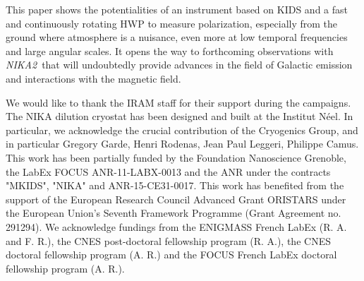 \documentclass[twocolumn, traditabstract]{aa}
\newcommand{\nikad}{{\it NIKA2}}
\begin{document}
This paper shows the potentialities of an instrument based on
KIDS and a fast and continuously rotating HWP to measure polarization, especially
from the ground where atmosphere is a nuisance, even more at low temporal
frequencies and large angular scales. It opens the way to forthcoming
observations with \nikad\ that will undoubtedly provide advances in the field of
Galactic emission and interactions with the magnetic field.
 
    
 \begin{acknowledgements}
We would like to thank the IRAM staff for their support during the campaigns. 
The NIKA dilution cryostat has been designed and built at the Institut N\'eel. 
In particular, we acknowledge the crucial contribution of the Cryogenics Group, and 
in particular Gregory Garde, Henri Rodenas, Jean Paul Leggeri, Philippe Camus. 
This work has been partially funded by the Foundation Nanoscience Grenoble, the LabEx FOCUS ANR-11-LABX-0013 and 
the ANR under the contracts "MKIDS", "NIKA" and ANR-15-CE31-0017. 
This work has benefited from the support of the European Research Council Advanced Grant ORISTARS 
under the European Union's Seventh Framework Programme (Grant Agreement no. 291294).
We acknowledge fundings from the ENIGMASS French LabEx (R. A. and F. R.), 
the CNES post-doctoral fellowship program (R. A.),  the CNES doctoral fellowship program (A. R.) and 
the FOCUS French LabEx doctoral fellowship program (A. R.).
\end{acknowledgements}
\end{document}
